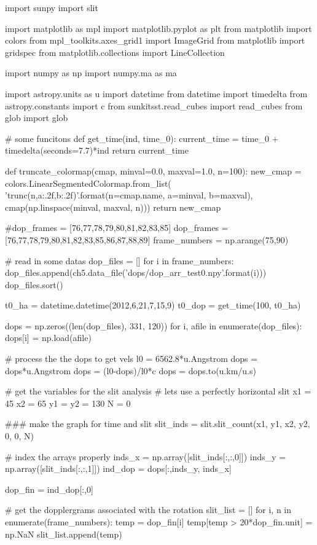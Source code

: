\begin{pycode}[chapter5]
import sunpy
import slit

import matplotlib as mpl
import matplotlib.pyplot as plt
from matplotlib import colors
from mpl_toolkits.axes_grid1 import ImageGrid
from matplotlib import gridspec
from matplotlib.collections import LineCollection

import numpy as np
import numpy.ma as ma

import astropy.units as u
import datetime
from datetime import timedelta
from astropy.constants import c
from sunkitsst.read_cubes import read_cubes
from glob import glob

# some funcitons
def get_time(ind, time_0):
    current_time = time_0 + timedelta(seconds=7.7)*ind
    return current_time

def truncate_colormap(cmap, minval=0.0, maxval=1.0, n=100):
    new_cmap = colors.LinearSegmentedColormap.from_list(
        'trunc({n},{a:.2f},{b:.2f})'.format(n=cmap.name, a=minval, b=maxval),
        cmap(np.linspace(minval, maxval, n)))
    return new_cmap


#dop_frames = [76,77,78,79,80,81,82,83,85]
dop_frames = [76,77,78,79,80,81,82,83,85,86,87,88,89]
frame_numbers = np.arange(75,90)

# read in some datas
dop_files = []
for i in frame_numbers:
    dop_files.append(ch5.data_file('dops/dop_arr_test0{}.npy'.format(i)))
dop_files.sort()

t0_ha = datetime.datetime(2012,6,21,7,15,9)
t0_dop = get_time(100, t0_ha)

dops = np.zeros((len(dop_files), 331, 120))
for i, afile in enumerate(dop_files):
    dops[i] = np.load(afile)

# process the the dops to get vels
l0 = 6562.8*u.Angstrom
dops = dops*u.Angstrom
dops = (l0-dops)/l0*c
dops = dops.to(u.km/u.s)

# get the variables for the slit analysis
# lets use a perfectly horizontal slit
x1 = 45
x2 = 65
y1 = y2 = 130
N = 0


### make the graph for time and slit
slit_inds = slit.slit_count(x1, y1, x2, y2, 0, 0, N)

# index the arrays properly
inds_x = np.array([slit_inds[:,:,0]])
inds_y = np.array([slit_inds[:,:,1]])
ind_dop = dops[:,inds_y, inds_x]

dop_fin = ind_dop[:,0]

# get the dopplergrams associated with the rotation
slit_list = []
for i, n in enumerate(frame_numbers):
    temp = dop_fin[i]
    temp[temp > 20*dop_fin.unit] = np.NaN
    slit_list.append(temp)


\end{pycode}
